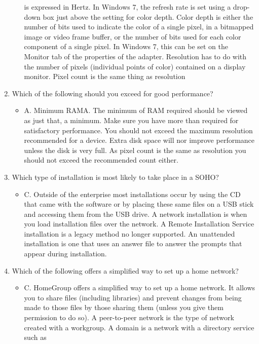 \documentclass{article}
\begin{document}
\begin{enumerate}
\begin{itemize}
is expressed in Hertz. In Windows 7, the refresh rate is set using a drop-down box just
above the setting for color depth. Color depth is either the number of bits used to indicate
the color of a single pixel, in a bitmapped image or video frame buffer, or the number of
bits used for each color component of a single pixel. In Windows 7, this can be set on the
Monitor tab of the properties of the adapter. Resolution has to do with the number of pixels
(individual points of color) contained on a display monitor. Pixel count is the same thing as
resolution
    \end{itemize}
    \item Which of the following should you exceed for good performance?
    \begin{itemize}
        \item A. Minimum RAMA. The minimum of RAM required should be viewed as just that, a minimum. Make
sure you have more than required for satisfactory performance. You should not exceed
the maximum resolution recommended for a device. Extra disk space will nor improve
performance unless the disk is very full. As pixel count is the same as resolution you should
not exceed the recommended count either.
    \end{itemize}
    \item Which type of installation is most likely to take place in a SOHO?
    \begin{itemize}
        \item C. Outside of the enterprise most installations occur by using the CD that came with the
software or by placing these same files on a USB stick and accessing them from the USB
drive. A network installation is when you load installation files over the network. A Remote
Installation Service installation is a legacy method no longer supported. An unattended
installation is one that uses an answer file to answer the prompts that appear during
installation.
    \end{itemize}
    \item Which of the following offers a simplified way to set up a home network?
    \begin{itemize}
        \item C. HomeGroup offers a simplified way to set up a home network. It allows you to share files
(including libraries) and prevent changes from being made to those files by those sharing
them (unless you give them permission to do so). A peer-to-peer network is the type of
network created with a workgroup. A domain is a network with a directory service such as

\end{itemize}
\end{enumerate}
\end{document}
